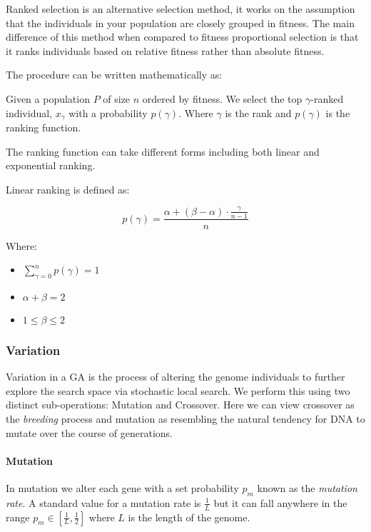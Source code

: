 Ranked selection is an alternative selection method, it works on the assumption that the individuals in your population are closely grouped in fitness. The main difference of this method when compared to fitness proportional selection is that it ranks individuals based on relative fitness rather than absolute fitness.

The procedure can be written mathematically as:

Given a population $P$ of size $n$ ordered by fitness. We select the top \(\gamma\)-ranked individual, $x_{\gamma}$ with a probability $p(\gamma)$. Where \(\gamma\) is the rank and $p(\gamma)$ is the ranking function.

The ranking function can take different forms including both linear and exponential ranking.

Linear ranking is defined as:

\begin{equation}
p(\gamma)= \frac{\alpha + (\beta-\alpha) \cdot \frac{\gamma}{n-1}}{n}
\end{equation}

Where:

\begin{itemize}
  \item $\sum_{\gamma=0}^n p(\gamma) = 1$
  \item $\alpha + \beta = 2$
  \item $1 \leq \beta \leq 2$
\end{itemize}

\subsubsection{Variation}

Variation in a GA is the process of altering the genome individuals to further explore the search space via stochastic local search.
We perform this using two distinct sub-operations: Mutation and Crossover.
Here we can view crossover as the \textit{breeding} process and mutation as resembling the natural tendency for DNA to mutate over the course of generations.

\paragraph{Mutation}
In mutation we alter each gene with a set probability $p_m$ known as the \textit{mutation rate}. A standard value for a mutation rate is $ \frac{1}{L} $ but it can fall anywhere in the range $p_m \in [ \frac{1}{L} , \frac{1}{2} ] $ where $L$ is the length of the genome.

